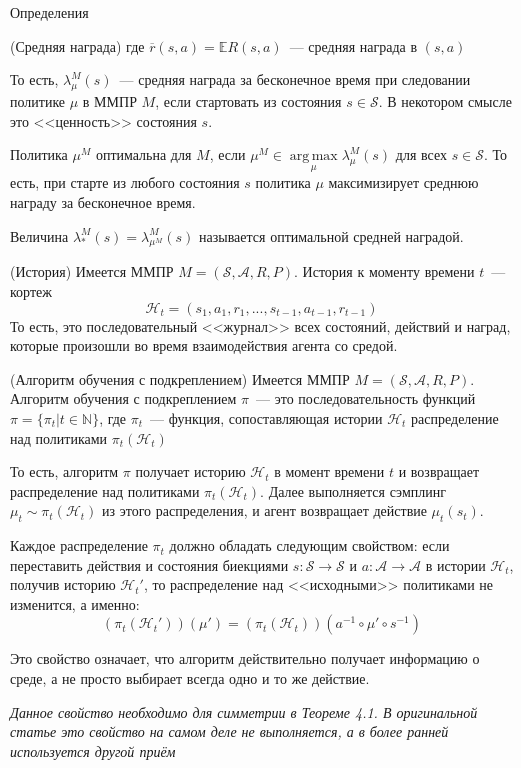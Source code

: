 \documentclass{beamer}
\DeclareMathOperator*{\argmax}{arg\,max}
\newcommand{\Hh}{\mathcal{H}}
\newcommand{\E}{\mathbb{E}}
\newcommand{\N}{\mathbb{N}}
\newcommand{\Ss}{\mathcal{S}}
\newcommand{\A}{\mathcal{A}}
\begin{document}
\begin{frame}{Определения}
\begin{definition}{(Средняя награда)}
	где $\overline{r}(s,a)=\E R(s,a)$~--- средняя награда в $(s,a)$
	
	То есть, $\lambda_{\mu}^M(s)$~--- средняя награда за бесконечное время при следовании политике $\mu$ в ММПР $M$, если стартовать из состояния $s\in\Ss$. В некотором смысле это <<ценность>> состояния $s$.
	
	Политика $\mu^M$ оптимальна для $M$, если $\mu^M\in\argmax\limits_{\mu}\lambda^M_{\mu}(s)$ для всех $s\in\Ss$. То есть, при старте из любого состояния $s$ политика $\mu$ максимизирует среднюю награду за бесконечное время.
	
	Величина $\lambda_*^M(s)=\lambda_{\mu^M}^M(s)$ называется оптимальной средней наградой.
\end{definition}

\begin{definition}{(История)}
	Имеется ММПР $M=(\Ss,\A,R,P)$. История к моменту времени $t$~--- кортеж $$\Hh_t=(s_1,a_1,r_1,...,s_{t-1},a_{t-1},r_{t-1})$$
	То есть, это последовательный <<журнал>> всех состояний, действий и наград, которые произошли во время взаимодействия агента со средой.
\end{definition}

\begin{definition}{(Алгоритм обучения с подкреплением)}
	Имеется ММПР $M=(\Ss, \A,R,P)$. Алгоритм обучения с подкреплением $\pi$~--- это последовательность функций $\pi=\{\pi_t\big|t\in\N\}$, где $\pi_t$~--- функция, сопоставляющая истории $\Hh_t$ распределение над политиками $\pi_t(\Hh_t)$
	
	То есть, алгоритм $\pi$ получает историю $\Hh_t$ в момент времени $t$ и возвращает распределение над политиками $\pi_t(\Hh_t)$. Далее выполняется сэмплинг $\mu_t\sim\pi_t(\Hh_t)$ из этого распределения, и агент возвращает действие $\mu_t(s_t)$.
	
	Каждое распределение $\pi_t$ должно обладать следующим свойством: если переставить действия и состояния биекциями $s\colon \Ss\to\Ss$ и $a\colon \A\to\A$ в истории $\Hh_t$, получив историю $\Hh_t'$, то распределение над <<исходными>> политиками не изменится, а именно:
	$$(\pi_t(\Hh_t'))(\mu')=(\pi_t(\Hh_t))(a^{-1}\circ\mu'\circ s^{-1})$$
	
	Это свойство означает, что алгоритм действительно получает информацию о среде, а не просто выбирает всегда одно и то же действие.
	
	{\em Данное свойство необходимо для симметрии в Теореме 4.1. В оригинальной статье \cite{lower_bounds} это свойство на самом деле не выполняется, а в более ранней \cite{bubeck} используется другой приём}
\end{definition}


\end{frame}
\end{document}
